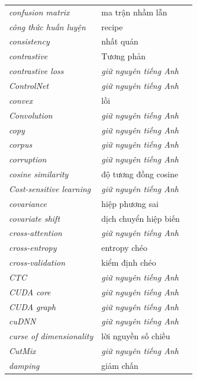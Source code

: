 \documentclass[deep_learning.tex]{subfiles}
\begin{document}
\begin{longtable}{@{}L{5.2cm}L{5.9cm}L{2.6cm}@{}}
\emph{confusion matrix} & ma trận nhầm lẫn & \\
\emph{công thức huấn luyện} & recipe & \\
\emph{consistency} & nhất quán & \\
\emph{contrastive} & Tương phản & \\
\emph{contrastive loss} & \emph{\color{tiercol}giữ nguyên tiếng Anh} & \\
\emph{ControlNet} & \emph{\color{tiercol}giữ nguyên tiếng Anh} & \\
\emph{convex} & lồi & \\
\emph{Convolution} & \emph{\color{tiercol}giữ nguyên tiếng Anh} & \\
\emph{copy} & \emph{\color{tiercol}giữ nguyên tiếng Anh} & \\
\emph{corpus} & \emph{\color{tiercol}giữ nguyên tiếng Anh} & \\
\emph{corruption} & \emph{\color{tiercol}giữ nguyên tiếng Anh} & \\
\emph{cosine similarity} & độ tương đồng cosine & \\
\emph{Cost-sensitive learning} & \emph{\color{tiercol}giữ nguyên tiếng Anh} & \\
\emph{covariance} & hiệp phương sai & \\
\emph{covariate shift} & dịch chuyển hiệp biến & \\
\emph{cross-attention} & \emph{\color{tiercol}giữ nguyên tiếng Anh} & \\
\emph{cross-entropy} & entropy chéo & \\
\emph{cross-validation} & kiểm định chéo & \\
\emph{CTC} & \emph{\color{tiercol}giữ nguyên tiếng Anh} & \\
\emph{CUDA core} & \emph{\color{tiercol}giữ nguyên tiếng Anh} & \\
\emph{CUDA graph} & \emph{\color{tiercol}giữ nguyên tiếng Anh} & \\
\emph{cuDNN} & \emph{\color{tiercol}giữ nguyên tiếng Anh} & \\
\emph{curse of dimensionality} & lời nguyền số chiều & \\
\emph{CutMix} & \emph{\color{tiercol}giữ nguyên tiếng Anh} & \\
\emph{damping} & giảm chấn & \\

\end{longtable}
\end{document}

